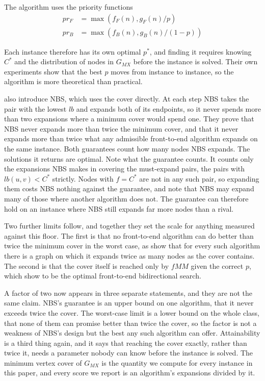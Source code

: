 \documentclass[letterpaper]{article} %
\begin{document}
The algorithm uses the priority functions
\begin{align*} pr_F &= \max(f_F(n), g_F(n)/p)\\ pr_B &= \max(f_B(n), g_B(n)/(1-p))
\end{align*}

Each instance therefore has its own optimal $p^*$, and finding it requires knowing $C^*$ and the distribution of nodes in $G_{MX}$ before the instance is solved. Their own experiments show that the best $p$ moves from instance to instance, so the algorithm is more theoretical than practical.

\citet{chen2017nbs} also introduce NBS, which uses the cover directly. At each step NBS takes the pair with the lowest $lb$ and expands both of its endpoints, so it never spends more than two expansions where a minimum cover would spend one. They prove that NBS never expands more than twice the minimum cover, and that it never expands more than twice what any admissible front-to-end algorithm expands on the same instance. Both guarantees count how many nodes NBS expands. The solutions it returns are optimal. Note what the guarantee counts. It counts only the expansions NBS makes in covering the must-expand pairs, the pairs with $lb(u,v) < C^*$ strictly. Nodes with $f = C^*$ are not in any such pair, so expanding them costs NBS nothing against the guarantee, and \citet{chen2017nbs} note that NBS may expand many of those where another algorithm does not. The guarantee can therefore hold on an instance where NBS still expands far more nodes than a rival.

Two further limits follow, and together they set the scale for anything measured against this floor. The first is that no front-to-end algorithm can do better than twice the minimum cover in the worst case, as \citet{shaham2017minimal} show that for every such algorithm there is a graph on which it expands twice as many nodes as the cover contains. The second is that the cover itself is reached only by $fMM$ given the correct $p$, which \citet{shaham2017minimal} show to be the optimal front-to-end bidirectional search.

A factor of two now appears in three separate statements, and they are not the same claim. NBS's guarantee is an upper bound on one algorithm, that it never exceeds twice the cover. The worst-case limit is a lower bound on the whole class, that none of them can promise better than twice the cover, so the factor is not a weakness of NBS's design but the best any such algorithm can offer. Attainability is a third thing again, and it says that reaching the cover exactly, rather than twice it, needs a parameter nobody can know before the instance is solved. The minimum vertex cover of $G_{MX}$ is the quantity we compute for every instance in this paper, and every score we report is an algorithm's expansions divided by it.
\end{document}
